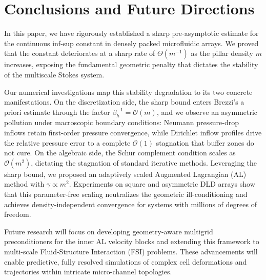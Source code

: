 \documentclass{elsarticle}
\begin{document}
\section{Conclusions and Future Directions}\label{sec:conclusion}

In this paper, we have rigorously established a sharp pre-asymptotic estimate for the continuous inf-sup constant in densely packed microfluidic arrays. We proved that the constant deteriorates at a sharp rate of $\Theta(m^{-1})$ as the pillar density $m$ increases, exposing the fundamental geometric penalty that dictates the stability of the multiscale Stokes system.

Our numerical investigations map this stability degradation to its two concrete manifestations. On the discretization side, the sharp bound enters Brezzi's a priori estimate through the factor $\beta_h^{-1} = \mathcal{O}(m)$, and we observe an asymmetric pollution under macroscopic boundary conditions: Neumann pressure-drop inflows retain first-order pressure convergence, while Dirichlet inflow profiles drive the relative pressure error to a complete $\mathcal{O}(1)$ stagnation that buffer zones do not cure. On the algebraic side, the Schur complement condition scales as $\mathcal{O}(m^2)$, dictating the stagnation of standard iterative methods. Leveraging the sharp bound, we proposed an adaptively scaled Augmented Lagrangian (AL) method with $\gamma \propto m^2$. Experiments on square and asymmetric DLD arrays show that this parameter-free scaling neutralizes the geometric ill-conditioning and achieves density-independent convergence for systems with millions of degrees of freedom.

Future research will focus on developing geometry-aware multigrid preconditioners for the inner AL velocity blocks and extending this framework to multi-scale Fluid-Structure Interaction (FSI) problems. These advancements will enable predictive, fully resolved simulations of complex cell deformations and trajectories within intricate micro-channel topologies.

\appendix




\end{document}
